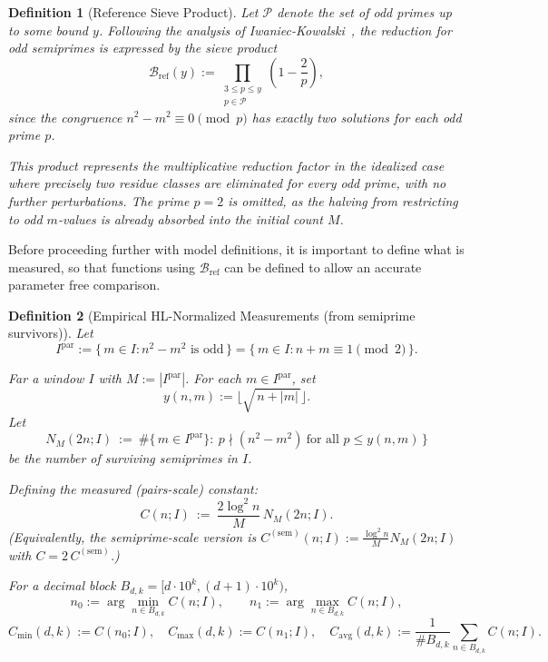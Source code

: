 \documentclass[11pt]{article}
\theoremstyle{inline}
\theoremstyle{break}
\theoremstyle{break}
\theoremstyle{break}
\theoremstyle{break}
\theoremstyle{break}
\theoremstyle{break}
\theoremstyle{break}
\newtheorem{definition}{Definition}
\theoremstyle{inline}
\newcommand{\tavg}{{\scriptscriptstyle\mathrm{avg}}}
\newcommand{\tref}{{\scriptscriptstyle\mathrm{ref}}}
\newcommand{\Cmeas}{C}              %
\newcommand{\Nmeas}{n}              %
\newcommand{\Bref}{\mathcal{B}_\tref}
\newcommand{\Ipar}{I^{\mathrm{par}}}
\begin{document}
\begin{definition}[Reference Sieve Product]
\label{def:Bref}
Let \( \mathcal{P} \) denote the set of odd primes up to some bound \( y \).
Following the analysis of Iwaniec-Kowalski~\cite{IwaniecKowalski2004}, the reduction for odd semiprimes is expressed by the sieve product
\begin{equation}
\Bref(y)
    := \prod_{\substack{3 \le p \le y \\ p \in \mathcal{P}}}
       \left( 1 - \frac{2}{p} \right),
\end{equation}
since the congruence \( n^2 - m^2 \equiv 0 \pmod{p} \) has exactly two solutions for each odd prime \( p \).

This product represents the multiplicative reduction factor in the
\emph{idealized} case where precisely two residue classes are eliminated
for every odd prime, with no further perturbations. The prime \( p = 2 \)
is omitted, as the halving from restricting to odd \( m \)-values is already
absorbed into the initial count \( M \).
\end{definition}

Before proceeding further with model definitions, it is important to define what is measured, so that functions using \( \Bref \) can be 
defined to allow an accurate parameter free comparison.

\begin{definition}[Empirical HL-Normalized Measurements (from semiprime survivors)]\label{semiprime-survivors}
Let
\begin{equation}
\Ipar := \{\, m\in I : n^2-m^2 \text{ is odd} \,\}
= \{\, m\in I : n+m \equiv 1 \pmod 2 \,\}.
\end{equation}

Far a window \(I\) with \(M:=\left|\Ipar\right|\).
For each \( m \in \Ipar \), set
\begin{equation}
y(n,m):=\bigl\lfloor \sqrt{\,n+|m|\,}\bigr\rfloor .
\end{equation}
Let
\begin{equation}
N_M(2n;I)\ :=\ \#\{\,m\in \Ipar\}:\ p\nmid (n^2-m^2)\ \text{for all }p\le y(n,m)\,\}
\end{equation}
be the number of surviving \emph{semiprimes} in \(I\).

Defining the measured (pairs-scale) constant:
\begin{equation}
\Cmeas(n;I)\ :=\ \frac{2\log^2 n}{M}\,N_M(2n;I).
\end{equation}
(Equivalently, the semiprime-scale version is
\(\Cmeas^{(\mathrm{sem})}(n;I):=\frac{\log^2 n}{M}N_M(2n;I)\) with
\(\Cmeas=2\,\Cmeas^{(\mathrm{sem})}\).)

For a decimal block \(B_{d,k}=[d\cdot10^k,(d+1)\cdot10^k)\),
\begin{equation}
\Nmeas_0:=\arg\min_{n\in B_{d,k}}\Cmeas(n;I),\qquad
\Nmeas_1:=\arg\max_{n\in B_{d,k}}\Cmeas(n;I),
\end{equation}
\begin{equation}
\Cmeas_{\min}(d,k):=\Cmeas(\Nmeas_0;I),\quad
\Cmeas_{\max}(d,k):=\Cmeas(\Nmeas_1;I),\quad
\Cmeas_{\tavg}(d,k):=\frac{1}{\#B_{d,k}}\sum_{n\in B_{d,k}}\Cmeas(n;I).
\end{equation}
\end{definition}
\end{document}
